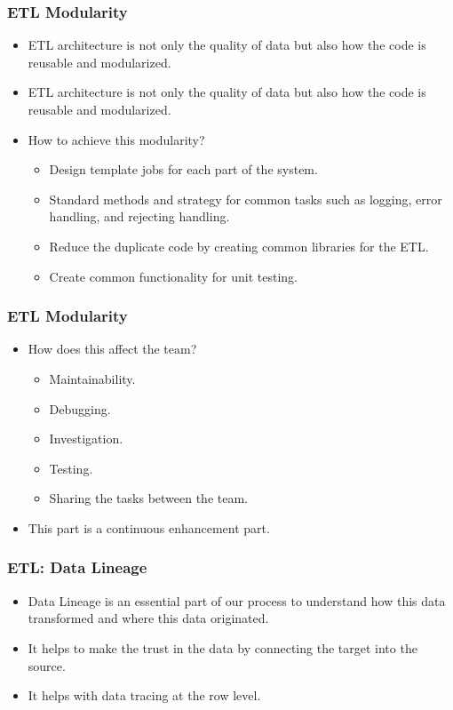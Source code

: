 \begin{frame}
	\frametitle{ETL Modularity}
	\begin{itemize}
		\item ETL architecture is not only the quality of data but also how the code is reusable and modularized. 
		\item ETL architecture is not only the quality of data but also how the code is reusable and modularized. 		
		\item How to achieve this modularity?
		\begin{itemize}
			\item Design template jobs for each part of the system.
			\item Standard methods and strategy for common tasks such as logging, error handling, and rejecting handling.
			\item  Reduce the duplicate code by creating  common libraries for the ETL.
			\item  Create common functionality for unit testing.

		\end{itemize}
	\end{itemize}
\end{frame}

\begin{frame}
	\frametitle{ETL Modularity}
	\begin{itemize}
		\item How does this affect the team?
		\begin{itemize}
			\item Maintainability.
			\item Debugging.
			\item Investigation.
			\item Testing.
			\item Sharing the tasks between the team.

		\end{itemize}
		\item This part is a continuous enhancement part.
	\end{itemize}
\end{frame}
\begin{frame}
	\frametitle{ETL: Data Lineage}
	\begin{itemize}
		\item Data Lineage is an essential part of our process to understand how this data transformed and where this data originated.
		\item It helps to make the trust in the data by connecting the target into the source.
		\item It helps with data tracing at the row level.
	\end{itemize}
\end{frame}

